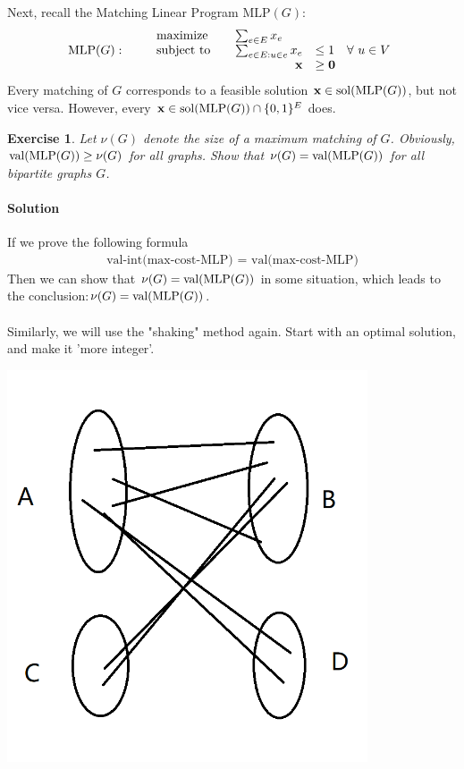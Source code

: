 \documentclass[12pt,a4]{article}
\newtheorem{exercise}[theorem]{Exercise}
\begin{document}
Next, recall the Matching Linear Program $\textrm{MLP}(G)$:
\begin{align*}
  \textrm{MLP($G$)}: \qquad
  \begin{array}{lrl}
    \textnormal{maximize} \quad & \multicolumn{2}{l}{\sum_{e \in E} x_e} \\
    \textnormal{subject to} \quad & \sum_{e \in E: u \in e} x_e  & \leq 1 \quad \forall\ u \in V \\
     & \x & \geq \mathbf{0}  
  \end{array}
\end{align*}
Every matching of $G$ corresponds to a feasible solution $\mathbf{x} \in \textup{\textrm{sol}}(\textrm{MLP}(G))$, but not 
vice versa. However, every $\mathbf{x} \in \textup{\textrm{sol}}(\textrm{MLP}(G)) \cap \{0,1\}^E$ does.

\begin{exercise}
   Let $\nu(G)$ denote the size of a maximum matching of $G$. 
   Obviously, $ \textnormal{val}(\textrm{MLP}(G)) \geq \nu(G)$ for all graphs.
   Show that
   $\nu(G) = \textnormal{val}(\textrm{MLP}(G))$ for all {\em bipartite} graphs $G$.
\end{exercise}

\paragraph{Solution} If we prove the following formula
\begin{align*}
    \text{val-int(max-cost-MLP) } = \text{ val(max-cost-MLP)}
\end{align*}
Then we can show that $\nu(G) = \textnormal{val}(\textrm{MLP}(G))$ in some situation, which leads to the conclusion:$\nu(G) = \textnormal{val}(\textrm{MLP}(G))$. 
\paragraph{}Similarly, we will use the "shaking" method again. Start with an optimal solution, and make it 'more integer'.
 \begin{center}
  \includegraphics[width=0.8\textwidth]{p1.png}
 \end{center}
\end{document}

